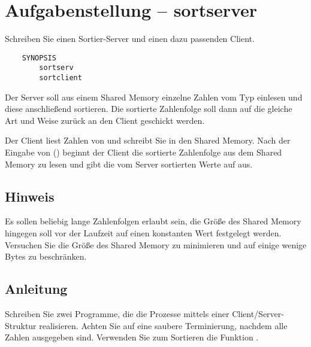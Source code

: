 




\section*{Aufgabenstellung -- sortserver}

Schreiben Sie einen Sortier-Server und einen dazu passenden Client.

\begin{verbatim}
    SYNOPSIS
        sortserv
        sortclient
\end{verbatim}

Der Server soll aus einem Shared Memory einzelne Zahlen vom Typ
 einlesen und diese anschließend sortieren. Die sortierte
Zahlenfolge soll dann auf die gleiche Art und Weise zurück an den Client
geschickt werden.

Der Client liest Zahlen von  und schreibt Sie in den Shared
Memory. Nach der Eingabe von  () beginnt
der Client die sortierte Zahlenfolge aus dem Shared Memory zu lesen und gibt die
vom Server sortierten Werte auf  aus.

\subsection*{Hinweis}
Es sollen beliebig lange Zahlenfolgen erlaubt sein, die Größe des Shared Memory
hingegen soll vor der Laufzeit auf einen konstanten Wert festgelegt werden.
Versuchen Sie die Größe des Shared Memory zu minimieren und auf einige wenige
Bytes zu beschränken.

\subsection*{Anleitung}
Schreiben Sie zwei Programme, die die Prozesse mittels einer
Client/Server-Struktur realisieren. Achten Sie auf eine saubere Terminierung,
nachdem alle Zahlen ausgegeben sind. Verwenden Sie zum Sortieren die Funktion
.

\osueguidelinesthree


